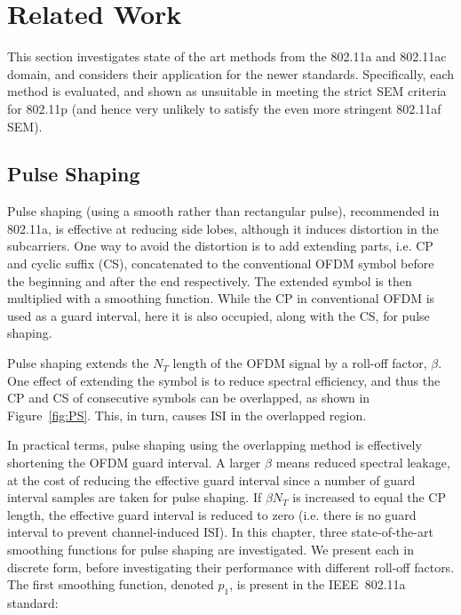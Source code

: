 \section{Related Work}

This section investigates state of the art methods from the 802.11a and 802.11ac domain, and considers their application for the newer standards.
Specifically, each method is evaluated, and shown as unsuitable in meeting the strict SEM criteria for 802.11p (and hence very unlikely to satisfy the even more stringent 802.11af SEM).

\subsection{Pulse Shaping}
\label{subsec:Pulse}
Pulse shaping (using a smooth rather than rectangular pulse), recommended in 802.11a, is effective at reducing side lobes, although it induces distortion in the subcarriers.
One way to avoid the distortion is to add extending parts, i.e. CP and cyclic suffix (CS), concatenated to the conventional OFDM symbol before the beginning and after the end respectively. The extended symbol is then multiplied with a smoothing function.
While the CP in conventional OFDM is used as a guard interval, here it is also occupied, along with the CS, for pulse shaping.

Pulse shaping extends the  $N_{T}$ length of the OFDM signal by a roll-off factor, $\beta$.
One effect of extending the symbol is to reduce spectral efficiency, and thus the CP and CS of consecutive symbols can be overlapped, as shown in Figure~\ref{fig:PS}. This, in turn, causes ISI in the overlapped region.

In practical terms, pulse shaping using the overlapping method is effectively shortening the OFDM guard interval.
A larger $\beta$ means reduced spectral leakage, at the cost of reducing the effective guard interval since a number of guard interval samples are taken for pulse shaping.
If $\beta N_{T}$ is increased to equal the CP length, the effective guard interval is reduced to zero (i.e. there is no guard interval to prevent channel-induced ISI).
In this chapter, three state-of-the-art smoothing functions for pulse shaping are investigated. We present each in discrete form, before investigating their performance with different roll-off factors.
The first smoothing function, denoted $p_1$, is present in the IEEE~802.11a standard:

